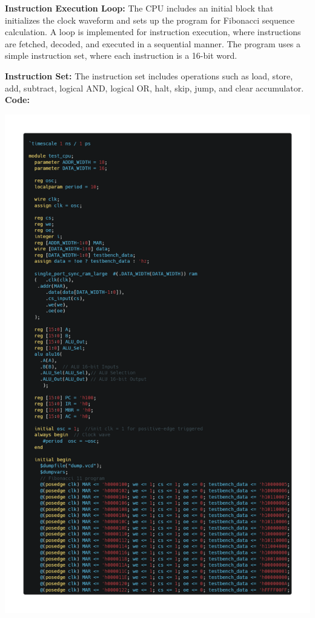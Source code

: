 \documentclass[12pt]{article}
\begin{document}
\textbf{Instruction Execution Loop:}
The CPU includes an initial block that initializes the clock waveform and sets up the program for Fibonacci sequence calculation.
A loop is implemented for instruction execution, where instructions are fetched, decoded, and executed in a sequential manner.
The program uses a simple instruction set, where each instruction is a 16-bit word.

\textbf{Instruction Set:}
The instruction set includes operations such as load, store, add, subtract, logical AND, logical OR, halt, skip, jump, and clear accumulator.\\
\newpage
\textbf{Code:}
\begin{center}
    \includegraphics[scale=0.45]{images/design1_1.png}

\end{center}
\end{document}
